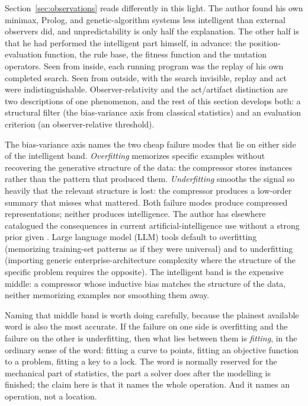 \documentclass[11pt]{article}
\begin{document}
Section~\ref{sec:observations} reads differently in this light. The author found his own minimax, Prolog, and genetic-algorithm systems less intelligent than external observers did, and unpredictability is only half the explanation. The other half is that he had performed the intelligent part himself, in advance: the position-evaluation function, the rule base, the fitness function and the mutation operators. Seen from inside, each running program was the replay of his own completed search. Seen from outside, with the search invisible, replay and act were indistinguishable. Observer-relativity and the act/artifact distinction are two descriptions of one phenomenon, and the rest of this section develops both: a structural filter (the bias-variance axis from classical statistics) and an evaluation criterion (an observer-relative threshold).

The bias-variance axis names the two cheap failure modes that lie on either side of the intelligent band. \emph{Overfitting} memorizes specific examples without recovering the generative structure of the data: the compressor stores instances rather than the pattern that produced them. \emph{Underfitting} smooths the signal so heavily that the relevant structure is lost: the compressor produces a low-order summary that misses what mattered. Both failure modes produce compressed representations; neither produces intelligence. The author has elsewhere catalogued the consequences in current artificial-intelligence use without a strong prior given \citep{gavrilov_machines_generalize_2026}. Large language model (LLM) tools default to overfitting (memorizing training-set patterns as if they were universal) and to underfitting (importing generic enterprise-architecture complexity where the structure of the specific problem requires the opposite). The intelligent band is the expensive middle: a compressor whose inductive bias matches the structure of the data, neither memorizing examples nor smoothing them away.

Naming that middle band is worth doing carefully, because the plainest available word is also the most accurate. If the failure on one side is overfitting and the failure on the other is underfitting, then what lies between them is \emph{fitting}, in the ordinary sense of the word: fitting a curve to points, fitting an objective function to a problem, fitting a key to a lock. The word is normally reserved for the mechanical part of statistics, the part a solver does after the modelling is finished; the claim here is that it names the whole operation. And it names an operation, not a location.
\end{document}
